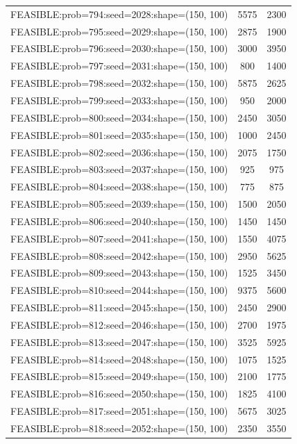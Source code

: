 \begin{longtable}{lcc}
FEASIBLE:prob=794:seed=2028:shape=(150, 100) &     5575 &  2300 \\
FEASIBLE:prob=795:seed=2029:shape=(150, 100) &     2875 &  1900 \\
FEASIBLE:prob=796:seed=2030:shape=(150, 100) &     3000 &  3950 \\
FEASIBLE:prob=797:seed=2031:shape=(150, 100) &      800 &  1400 \\
FEASIBLE:prob=798:seed=2032:shape=(150, 100) &     5875 &  2625 \\
FEASIBLE:prob=799:seed=2033:shape=(150, 100) &      950 &  2000 \\
FEASIBLE:prob=800:seed=2034:shape=(150, 100) &     2450 &  3050 \\
FEASIBLE:prob=801:seed=2035:shape=(150, 100) &     1000 &  2450 \\
FEASIBLE:prob=802:seed=2036:shape=(150, 100) &     2075 &  1750 \\
FEASIBLE:prob=803:seed=2037:shape=(150, 100) &      925 &   975 \\
FEASIBLE:prob=804:seed=2038:shape=(150, 100) &      775 &   875 \\
FEASIBLE:prob=805:seed=2039:shape=(150, 100) &     1500 &  2050 \\
FEASIBLE:prob=806:seed=2040:shape=(150, 100) &     1450 &  1450 \\
FEASIBLE:prob=807:seed=2041:shape=(150, 100) &     1550 &  4075 \\
FEASIBLE:prob=808:seed=2042:shape=(150, 100) &     2950 &  5625 \\
FEASIBLE:prob=809:seed=2043:shape=(150, 100) &     1525 &  3450 \\
FEASIBLE:prob=810:seed=2044:shape=(150, 100) &     9375 &  5600 \\
FEASIBLE:prob=811:seed=2045:shape=(150, 100) &     2450 &  2900 \\
FEASIBLE:prob=812:seed=2046:shape=(150, 100) &     2700 &  1975 \\
FEASIBLE:prob=813:seed=2047:shape=(150, 100) &     3525 &  5925 \\
FEASIBLE:prob=814:seed=2048:shape=(150, 100) &     1075 &  1525 \\
FEASIBLE:prob=815:seed=2049:shape=(150, 100) &     2100 &  1775 \\
FEASIBLE:prob=816:seed=2050:shape=(150, 100) &     1825 &  4100 \\
FEASIBLE:prob=817:seed=2051:shape=(150, 100) &     5675 &  3025 \\
FEASIBLE:prob=818:seed=2052:shape=(150, 100) &     2350 &  3550 \\

\end{longtable}
